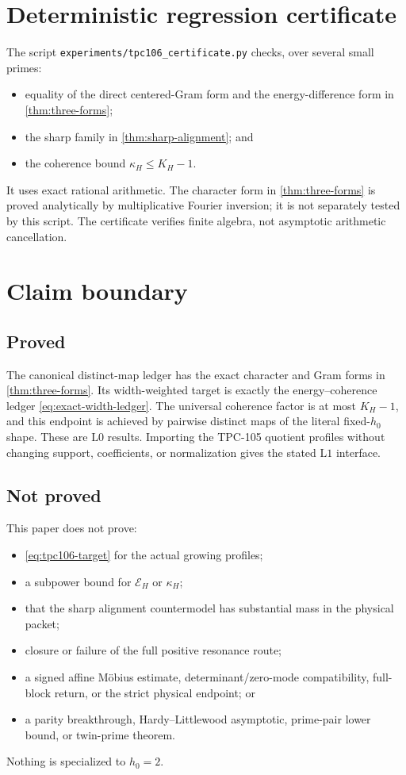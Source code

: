 \documentclass[11pt]{article}
\theoremstyle{remark}
\newcommand{\Lzero}{\mathrm{L0}}
\newcommand{\Lone}{\mathrm{L1}}
\begin{document}
\section{\texorpdfstring{\hspace{0.35em}}{}Deterministic regression certificate}

The script \texttt{experiments/tpc106\_certificate.py} checks, over
several small primes:
\begin{itemize}[leftmargin=2em]
\item equality of the direct centered-Gram form and the
energy-difference form in \cref{thm:three-forms};
\item the sharp family in \cref{thm:sharp-alignment}; and
\item the coherence bound \(\kappa_H\le K_H-1\).
\end{itemize}
It uses exact rational arithmetic.  The character form in
\cref{thm:three-forms} is proved analytically by multiplicative
Fourier inversion; it is not separately tested by this script.  The
certificate verifies finite algebra, not asymptotic arithmetic
cancellation.

\section{Claim boundary}

\subsection*{Proved}

The canonical distinct-map ledger has the exact character and Gram
forms in \cref{thm:three-forms}.  Its width-weighted target is
exactly the energy--coherence ledger
\eqref{eq:exact-width-ledger}.  The universal coherence factor is at
most \(K_H-1\), and this endpoint is achieved by pairwise distinct
maps of the literal fixed-\(h_0\) shape.  These are \(\Lzero\)
results.  Importing the TPC-105 quotient profiles without changing
support, coefficients, or normalization gives the stated
\(\Lone\) interface.

\subsection*{Not proved}

This paper does not prove:
\begin{itemize}[leftmargin=2em]
\item \eqref{eq:tpc106-target} for the actual growing profiles;
\item a subpower bound for \(\mathcal E_H\) or \(\kappa_H\);
\item that the sharp alignment countermodel has substantial mass in
the physical packet;
\item closure or failure of the full positive resonance route;
\item a signed affine M\"obius estimate, determinant/zero-mode
compatibility, full-block return, or the strict physical endpoint;
or
\item a parity breakthrough, Hardy--Littlewood asymptotic,
prime-pair lower bound, or twin-prime theorem.
\end{itemize}
Nothing is specialized to \(h_0=2\).
\end{document}
